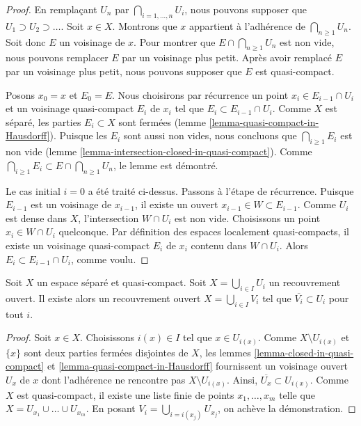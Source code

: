 \begin{proof}
En remplaçant $U_n$ par $\bigcap_{i = 1, \ldots, n} U_i$, nous pouvons
supposer que $U_1 \supset U_2 \supset \ldots$.
Soit $x \in X$. Montrons que $x$ appartient à l'adhérence de
$\bigcap_{n \geq 1} U_n$. Soit donc $E$ un voisinage de $x$.
Pour montrer que $E \cap \bigcap_{n \geq 1} U_n$ est non vide, nous pouvons
remplacer $E$ par un voisinage plus petit. Après avoir remplacé $E$ par un
voisinage plus petit, nous pouvons supposer que $E$ est quasi-compact.

\medskip\noindent
Posons $x_0 = x$ et $E_0 = E$. Nous choisirons par récurrence un point
$x_i \in E_{i - 1} \cap U_i$ et un voisinage quasi-compact $E_i$ de $x_i$ tel
que $E_i \subset E_{i - 1} \cap U_i$.
Comme $X$ est séparé, les parties $E_i \subset X$ sont fermées
(lemme \ref{lemma-quasi-compact-in-Hausdorff}).
Puisque les $E_i$ sont aussi non vides, nous concluons que
$\bigcap_{i \geq 1} E_i$ est non vide
(lemme \ref{lemma-intersection-closed-in-quasi-compact}).
Comme $\bigcap_{i \geq 1} E_i \subset E \cap \bigcap_{n \geq 1} U_n$,
le lemme est démontré.

\medskip\noindent
Le cas initial $i = 0$ a été traité ci-dessus. Passons à l'étape de
récurrence. Puisque $E_{i - 1}$ est un voisinage de $x_{i - 1}$, il existe un
ouvert $x_{i - 1} \in W \subset E_{i - 1}$.
Comme $U_i$ est dense dans $X$, l'intersection $W \cap U_i$ est non vide.
Choisissons un point $x_i \in W \cap U_i$ quelconque.
Par définition des espaces localement quasi-compacts, il existe un voisinage
quasi-compact $E_i$ de $x_i$ contenu dans $W \cap U_i$.
Alors $E_i \subset E_{i - 1} \cap U_i$, comme voulu.
\end{proof}

\begin{lemma}
\label{lemma-relatively-compact-refinement}
Soit $X$ un espace séparé et quasi-compact.
Soit $X = \bigcup_{i \in I} U_i$ un recouvrement ouvert.
Il existe alors un recouvrement ouvert $X = \bigcup_{i \in I} V_i$ tel que
$\overline{V_i} \subset U_i$ pour tout $i$.
\end{lemma}

\begin{proof}
Soit $x \in X$. Choisissons $i(x) \in I$ tel que $x \in U_{i(x)}$.
Comme $X \setminus U_{i(x)}$ et $\{x\}$ sont deux parties fermées disjointes
de $X$, les lemmes \ref{lemma-closed-in-quasi-compact} et
\ref{lemma-quasi-compact-in-Hausdorff} fournissent un voisinage ouvert $U_x$
de $x$ dont l'adhérence ne rencontre pas $X \setminus U_{i(x)}$.
Ainsi, $\overline{U_x} \subset U_{i(x)}$. Comme $X$ est quasi-compact, il
existe une liste finie de points $x_1, \ldots, x_m$ telle que
$X = U_{x_1} \cup \ldots \cup U_{x_m}$. En posant
$V_i = \bigcup_{i = i(x_j)} U_{x_j}$, on achève la démonstration.
\end{proof}

